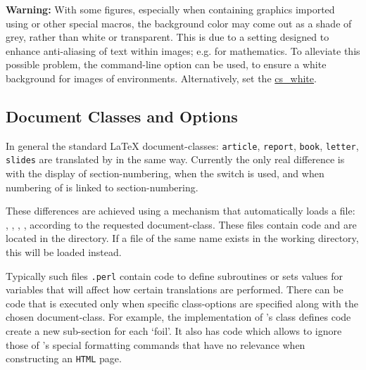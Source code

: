 \bigskip\noindent
\textbf{Warning: }
With some figures, especially when containing graphics imported using
 or other special macros, the background color
may come out as a shade of grey, rather than white or transparent.
This is due to a setting designed to enhance anti-aliasing of text
within images; e.g. for mathematics.
To alleviate this possible problem, the  command-line option
can be used, to ensure a white background for images of 
environments. 
Alternatively, set the  
\hyperref{variable}{variable (see section }{)}{cs_white}.


\subsection{Document Classes and Options\label{sec:cls}}
\tableofchildlinks*
{}%
In general the standard \LaTeX{} document-classes: 
\texttt{article}, \texttt{report}, \texttt{book}, \texttt{letter}, \texttt{slides}
are translated by \latextohtml{} in the same way. 
Currently the only real difference is with the display of section-numbering,
when the  switch is used,
and when numbering of  
is linked to section-numbering.

%
%

These differences are achieved using a mechanism that automatically loads a file:
, , , ,  
according to the requested document-class. 
These files contain \Perl{} code and are located in the  directory.
If a file of the same name exists in the working directory, this will be loaded
instead.

Typically such files \texttt{.perl} contain code to define subroutines 
or sets values for variables that will affect how certain translations are performed. 
There can be code that is executed only when specific class-options are specified
along with the chosen document-class.
For example, the  implementation of \FoilTeX's  class
defines code create a new sub-section for each `foil'.
It also has code which allows \latextohtml{} to ignore those of \FoilTeX's special 
formatting commands that have no relevance when constructing an \texttt{HTML} page.

\medskip 
{}%
%


